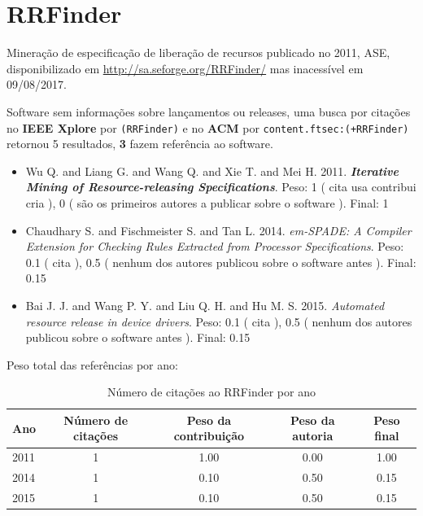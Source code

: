 \section{RRFinder}

Mineração de especificação de liberação de recursos
publicado no 2011, ASE,
disponibilizado em \url{http://sa.seforge.org/RRFinder/}
mas inacessível em 09/08/2017.

Software sem informações sobre lançamentos ou releases,
uma busca por citações no {\bf IEEE Xplore} por
\texttt{(RRFinder)}
e no {\bf ACM} por
\texttt{content.ftsec:(+RRFinder)}
retornou
5 resultados,
{\bf 3} fazem referência ao software.

\begin{itemize}
\item Wu Q. and Liang G. and Wang Q. and Xie T. and Mei H.
      2011.
        \textbf{\textit{ Iterative Mining of Resource-releasing Specifications}}.
      Peso:
      1 (
          cita
          usa
          contribui
          cria
      ),
      0 (
são os primeiros autores a publicar sobre o software
      ).
      Final:
      1

\item Chaudhary S. and Fischmeister S. and Tan L.
      2014.
        \textit{ em-SPADE: A Compiler Extension for Checking Rules Extracted from Processor Specifications}.
      Peso:
      0.1 (
          cita
      ),
      0.5 (
nenhum dos autores publicou sobre o software antes
      ).
      Final:
      0.15

\item Bai J. J. and Wang P. Y. and Liu Q. H. and Hu M. S.
      2015.
        \textit{ Automated resource release in device drivers}.
      Peso:
      0.1 (
          cita
      ),
      0.5 (
nenhum dos autores publicou sobre o software antes
      ).
      Final:
      0.15

\end{itemize}

Peso total das referências por ano:

\begin{table}[h]
\caption{Número de citações ao RRFinder por ano}
\centering
\begin{tabular}{| l | c | c | c | c |}
  \hline
  Ano & Número de citações & Peso da contribuição & Peso da autoria & Peso final \\
  \hline
  2011
    & 1
    & 1.00
    & 0.00
    & 1.00 \\
  2014
    & 1
    & 0.10
    & 0.50
    & 0.15 \\
  2015
    & 1
    & 0.10
    & 0.50
    & 0.15 \\
  \hline
\end{tabular}
\end{table}


